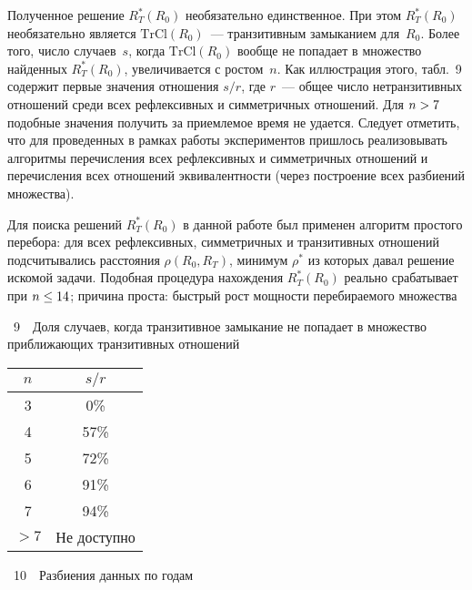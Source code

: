\begin{multicols}{2}
 Полученное решение $R^*_T(R_0)$ необязательно единственное. При этом $R^*_T(R_0)$ 
 необязательно является $\mathrm{TrCl}\left(R_0\right)$~--- 
транзитивным замыканием для~$R_0$. Более того, число случаев~$s$, когда $\mathrm{TrCl}\left(R_0\right)$ 
вообще не попадает в множество найден\-ных $R_T^*(R_0)$, увеличивается с ростом~$n$. 
Как иллюстрация этого, табл.~9 содержит первые значения отношения $s/r$, где $r$~--- 
общее число нетранзитивных отношений среди всех рефлексивных и сим\-мет\-рич\-ных 
отношений. Для $n\hm>7$ подобные значения получить за приемлемое время не удается. 
Следует отметить, что для проведенных в рамках работы экспериментов пришлось 
реализовывать алгоритмы перечисления всех рефлексивных и сим\-мет\-рич\-ных отношений и 
перечисления всех отношений эквивалентности (через построение всех разбиений 
множества).

      Для поиска решений $R^*_T(R_0)$ в данной работе был применен алгоритм простого 
перебора: для  всех рефлексивных, симметричных и транзитивных
 отношений 
подсчитывались расстояния $\rho(R_0,R_T)$, минимум $\rho^*$ из которых давал решение 
искомой  задачи. Подобная процедура нахождения $R^*_T(R_0)$
 реально срабатывает при 
$n\hm\leq 14$; причина проста:
быстрый рост мощности перебираемого множества\linebreak\vspace*{-12pt}
\begin{center}  %
\vspace*{3pt}
\parbox{47mm}{{{\tablename~9}\ \ \small{Доля случаев, когда транзитивное 
замыкание не попадает в множество прибли\-жа\-ющих 
транзитивных отношений}}}

\vspace*{2ex}

 
{\small 
\tabcolsep=14.3pt
\begin{tabular}{|c|c|}
\hline
$n$&$s/r$\\
\hline
3&\hphantom{9}0\%\\
4&57\%\\
5&72\%\\
6&91\%\\
7&94\%\\
$>7$\hphantom{$>\;$} &Не доступно\\
\hline
      \end{tabular}}
      \end{center}


\begin{center}  %
\vspace*{6pt}
\parbox{60mm}{{{\tablename~10}\ \ \small{Разбиения данных по годам}}}


\end{center}
\end{multicols}

